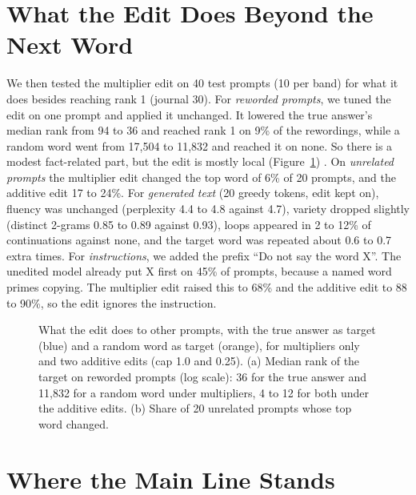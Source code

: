 \section{What the Edit Does Beyond the Next Word}\label{sec:beyond}

We then tested the multiplier edit on 40 test prompts (10 per band) for what it does besides reaching rank 1 (journal 30). For \emph{reworded prompts}, we tuned the edit on one prompt and applied it unchanged. It lowered the true answer's median rank from 94 to 36 and reached rank 1 on 9\% of the rewordings, while a random word went from 17,504 to 11,832 and reached it on none. So there is a modest fact-related part, but the edit is mostly local (Figure~\ref{fig:reworded}) \cite{p14,r61,r62}. On \emph{unrelated prompts} the multiplier edit changed the top word of 6\% of 20 prompts, and the additive edit 17 to 24\%. For \emph{generated text} (20 greedy tokens, edit kept on), fluency was unchanged (perplexity 4.4 to 4.8 against 4.7), variety dropped slightly (distinct 2-grams 0.85 to 0.89 against 0.93), loops appeared in 2 to 12\% of continuations against none, and the target word was repeated about 0.6 to 0.7 extra times. For \emph{instructions}, we added the prefix ``Do not say the word X''. The unedited model already put X first on 45\% of prompts, because a named word primes copying. The multiplier edit raised this to 68\% and the additive edit to 88 to 90\%, so the edit ignores the instruction.

\begin{figure}[!htb]
\centering
{}
\caption{What the edit does to other prompts, with the true answer as target (blue) and a random word as target (orange), for multipliers only and two additive edits (cap 1.0 and 0.25). (a) Median rank of the target on reworded prompts (log scale): 36 for the true answer and 11,832 for a random word under multipliers, 4 to 12 for both under the additive edits. (b) Share of 20 unrelated prompts whose top word changed.}\label{fig:reworded}
\end{figure}

\section{Where the Main Line Stands}

